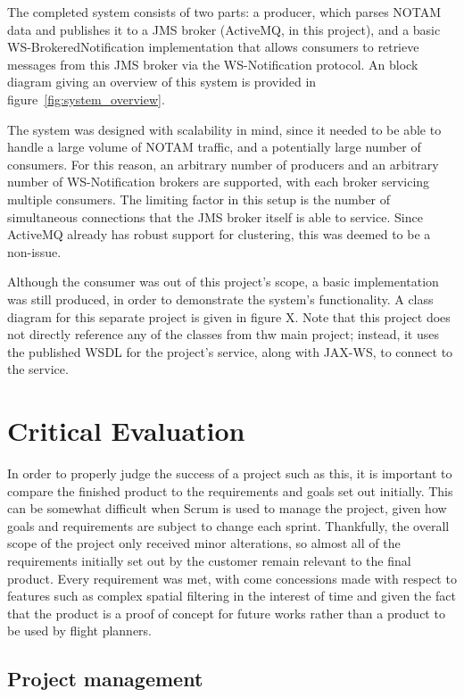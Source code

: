 \documentclass[a4paper, 12pt, twoside]{article}
\begin{document}
The completed system consists of two parts: a producer, which parses NOTAM data and publishes it to a JMS broker (ActiveMQ, in this project), and a basic WS-BrokeredNotification implementation that allows consumers to retrieve messages from this JMS broker via the WS-Notification protocol. An block diagram giving an overview of this system is provided in figure~\ref{fig:system_overview}.

The system was designed with scalability in mind, since it needed to be able to handle a large volume of NOTAM traffic, and a potentially large number of consumers. For this reason, an arbitrary number of producers and an arbitrary number of WS-Notification brokers are supported, with each broker servicing multiple consumers. The limiting factor in this setup is the number of simultaneous connections that the JMS broker itself is able to service. Since ActiveMQ already has robust support for clustering, this was deemed to be a non-issue.

Although the consumer was out of this project's scope, a basic implementation was still produced, in order to demonstrate the system's functionality. A class diagram for this separate project is given in figure X. Note that this project does not directly reference any of the classes from thw main project; instead, it uses the published WSDL for the project's service, along with JAX-WS, to connect to the service.

\section{Critical Evaluation}
\label{sec:critical_evaluation}

In order to properly judge the success of a project such as this, it is important to compare the finished product to the requirements and goals set out initially. This can be somewhat difficult when Scrum is used to manage the project, given how goals and requirements are subject to change each sprint. Thankfully, the overall scope of the project only received minor alterations, so almost all of the requirements initially set out by the customer remain relevant to the final product. Every requirement was met, with come concessions made with respect to features such as complex spatial filtering in the interest of time and given the fact that the product is a proof of concept for future works rather than a product to be used by flight planners.

\subsection{Project management}
\label{sec:eval_project_management}
\end{document}

